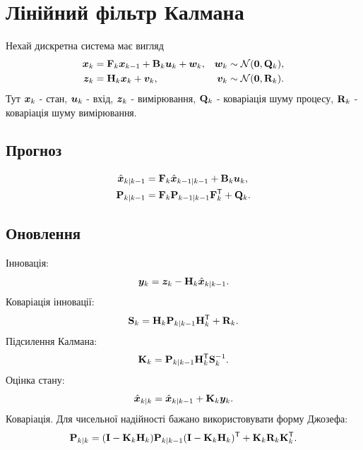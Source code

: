 \section{Лінійний фільтр Калмана}

Нехай дискретна система має вигляд
\begin{align}
    \bm{x}_k &= \mathbf{F}_k\bm{x}_{k-1}+\mathbf{B}_k\bm{u}_k+\bm{w}_k, & \bm{w}_k &\sim \mathcal{N}(\bm{0},\mathbf{Q}_k),\\
    \bm{z}_k &= \mathbf{H}_k\bm{x}_k+\bm{v}_k, & \bm{v}_k &\sim \mathcal{N}(\bm{0},\mathbf{R}_k).
\end{align}
Тут $\bm{x}_k$ - стан, $\bm{u}_k$ - вхід, $\bm{z}_k$ - вимірювання, $\mathbf{Q}_k$ - коваріація шуму процесу, $\mathbf{R}_k$ - коваріація шуму вимірювання.

\subsection{Прогноз}

\begin{align}
    \hat{\bm{x}}_{k|k-1} &= \mathbf{F}_k\hat{\bm{x}}_{k-1|k-1}+\mathbf{B}_k\bm{u}_k,\\
    \mathbf{P}_{k|k-1} &= \mathbf{F}_k\mathbf{P}_{k-1|k-1}\mathbf{F}_k^{\mathsf{T}} + \mathbf{Q}_k.
\end{align}

\subsection{Оновлення}

Інновація:
\begin{equation}
    \bm{y}_k = \bm{z}_k - \mathbf{H}_k\hat{\bm{x}}_{k|k-1}.
\end{equation}
Коваріація інновації:
\begin{equation}
    \mathbf{S}_k = \mathbf{H}_k\mathbf{P}_{k|k-1}\mathbf{H}_k^{\mathsf{T}} + \mathbf{R}_k.
\end{equation}
Підсилення Калмана:
\begin{equation}
    \mathbf{K}_k = \mathbf{P}_{k|k-1}\mathbf{H}_k^{\mathsf{T}} \mathbf{S}_k^{-1}.
\end{equation}
Оцінка стану:
\begin{equation}
    \hat{\bm{x}}_{k|k}=\hat{\bm{x}}_{k|k-1}+\mathbf{K}_k\bm{y}_k.
\end{equation}
Коваріація. Для чисельної надійності бажано використовувати форму Джозефа:
\begin{equation}
    \mathbf{P}_{k|k}
    = (\mathbf{I}-\mathbf{K}_k\mathbf{H}_k)\mathbf{P}_{k|k-1}(\mathbf{I}-\mathbf{K}_k\mathbf{H}_k)^{\mathsf{T}}
    + \mathbf{K}_k\mathbf{R}_k\mathbf{K}_k^{\mathsf{T}}.
\end{equation}

